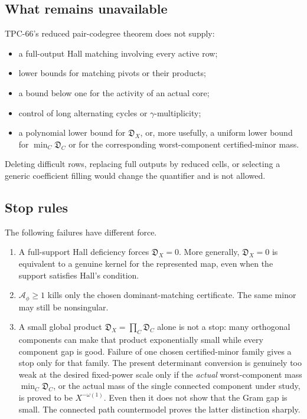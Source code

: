 \subsection{What remains unavailable}
TPC-66's reduced pair-codegree theorem does not supply:
\begin{itemize}
\item a full-output Hall matching involving every active row;
\item lower bounds for matching pivots or their products;
\item a bound below one for the activity of an actual core;
\item control of long alternating cycles or \(\gamma\)-multiplicity;
\item a polynomial lower bound for \(\mathfrak D_X\), or, more usefully, a
uniform lower bound for \(\min_C\mathfrak D_C\) or for the corresponding
worst-component certified-minor mass.
\end{itemize}
Deleting difficult rows, replacing full outputs by reduced cells, or selecting
a generic coefficient filling would change the quantifier and is not allowed.

\subsection{Stop rules}
The following failures have different force.
\begin{enumerate}[label=(\roman*)]
\item A full-support Hall deficiency forces
\(\mathfrak D_X=0\). More generally, \(\mathfrak D_X=0\) is equivalent to
a genuine kernel for the represented map, even when the support satisfies
Hall's condition.
\item \(\mathcal A_\phi\ge1\) kills only the chosen
dominant-matching certificate. The same minor may still be nonsingular.
\item A small global product
\(\mathfrak D_X=\prod_C\mathfrak D_C\) alone is not a stop: many orthogonal
components can make that product exponentially small while every component
gap is good. Failure of one chosen certified-minor family gives a stop only
for that family. The present determinant conversion is genuinely too weak at
the desired fixed-power scale only if the \emph{actual} worst-component mass
\(\min_C\mathfrak D_C\), or the actual mass of the single connected component
under study, is proved to be \(X^{-\omega(1)}\). Even then it does not show
that the Gram gap is small. The connected path countermodel proves the latter
distinction sharply.
\end{enumerate}

